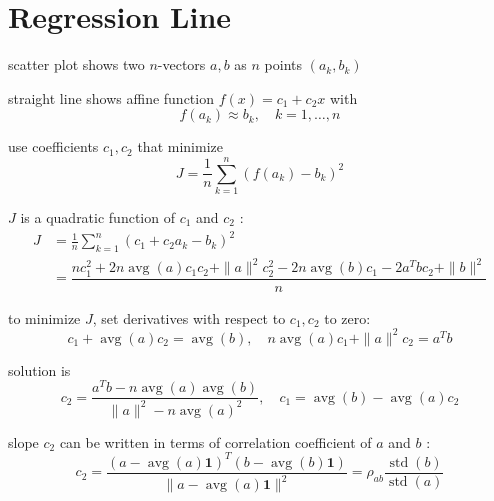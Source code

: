 \section{Regression Line}

scatter plot shows two $ n $-vectors $ a, b $ as $ n $ points $ \left(a_{k}, b_{k}\right) $

straight line shows affine function $ f(x)=c_{1}+c_{2} x $ with
\begin{equation}
f\left(a_{k}\right) \approx b_{k}, \quad k=1, \ldots, n
\end{equation}

\begin{problem}
    use coefficients $ c_{1}, c_{2} $ that minimize \begin{equation} J=\frac{1}{n} \sum_{k=1}^{n}\left(f\left(a_{k}\right)-b_{k}\right)^{2} \end{equation}

    $ J $ is a quadratic function of $ c_{1} $ and $ c_{2} $ :
\begin{equation}
\begin{aligned}
J &=\frac{1}{n} \sum_{k=1}^{n}\left(c_{1}+c_{2} a_{k}-b_{k}\right)^{2} \\
&=  \dfrac{n c_{1}^{2}+2 n \operatorname{a v g}(a) c_{1} c_{2}+\|a\|^{2} c_{2}^{2}-2 n \operatorname{avg}(b) c_{1}-2 a^{T} b c_{2}+\|b\|^{2}}{ n}
\end{aligned}
\end{equation}
\end{problem}

to minimize $ J $, set derivatives with respect to $ c_{1}, c_{2} $ to zero:
\begin{equation}
c_{1}+\operatorname{avg}(a) c_{2}=\operatorname{avg}(b), \quad n \operatorname{avg}(a) c_{1}+\|a\|^{2} c_{2}=a^{T} b
\end{equation}

\begin{theorem}
    solution is
\begin{equation}
c_{2}=\frac{a^{T} b-n \operatorname{avg}(a) \operatorname{avg}(b)}{\|a\|^{2}-n \operatorname{avg}(a)^{2}}, \quad c_{1}=\operatorname{avg}(b)-\operatorname{avg}(a) c_{2}
\end{equation}
\end{theorem}

\begin{corollary}
    slope $ c_{2} $ can be written in terms of correlation coefficient of $ a $ and $ b $ :
\begin{equation}
c_{2}=\frac{(a-\operatorname{avg}(a) \mathbf{1})^{T}(b-\operatorname{a v g}(b) \mathbf{1})}{\|a-\operatorname{a v g}(a) \mathbf{1}\|^{2}}=\rho_{a b} \frac{\operatorname{std}(b)}{\operatorname{std}(a)}
\end{equation}
\end{corollary}


